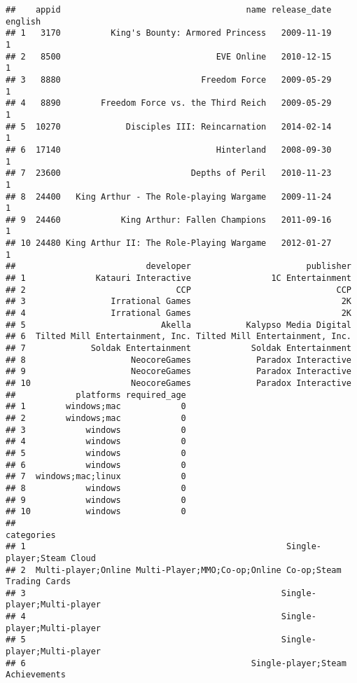 \documentclass[
]{article}
\begin{document}
\begin{verbatim}
##    appid                                     name release_date english
## 1   3170          King's Bounty: Armored Princess   2009-11-19       1
## 2   8500                               EVE Online   2010-12-15       1
## 3   8880                            Freedom Force   2009-05-29       1
## 4   8890        Freedom Force vs. the Third Reich   2009-05-29       1
## 5  10270             Disciples III: Reincarnation   2014-02-14       1
## 6  17140                               Hinterland   2008-09-30       1
## 7  23600                          Depths of Peril   2010-11-23       1
## 8  24400   King Arthur - The Role-playing Wargame   2009-11-24       1
## 9  24460            King Arthur: Fallen Champions   2011-09-16       1
## 10 24480 King Arthur II: The Role-Playing Wargame   2012-01-27       1
##                          developer                       publisher
## 1              Katauri Interactive                1C Entertainment
## 2                              CCP                             CCP
## 3                 Irrational Games                              2K
## 4                 Irrational Games                              2K
## 5                           Akella           Kalypso Media Digital
## 6  Tilted Mill Entertainment, Inc. Tilted Mill Entertainment, Inc.
## 7             Soldak Entertainment            Soldak Entertainment
## 8                     NeocoreGames             Paradox Interactive
## 9                     NeocoreGames             Paradox Interactive
## 10                    NeocoreGames             Paradox Interactive
##            platforms required_age
## 1        windows;mac            0
## 2        windows;mac            0
## 3            windows            0
## 4            windows            0
## 5            windows            0
## 6            windows            0
## 7  windows;mac;linux            0
## 8            windows            0
## 9            windows            0
## 10           windows            0
##                                                                     categories
## 1                                                    Single-player;Steam Cloud
## 2  Multi-player;Online Multi-Player;MMO;Co-op;Online Co-op;Steam Trading Cards
## 3                                                   Single-player;Multi-player
## 4                                                   Single-player;Multi-player
## 5                                                   Single-player;Multi-player
## 6                                             Single-player;Steam Achievements

\end{verbatim}
\end{document}
